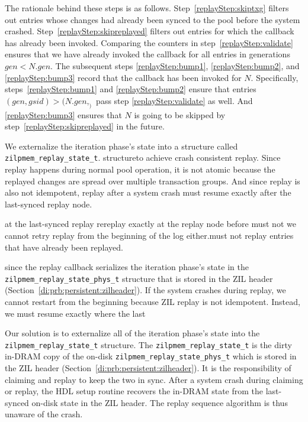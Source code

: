 \documentclass[12pt,a4paper,twoside]{book}
\begin{document}
The rationale behind these steps is as follows.
Step~\ref{replayStep:skiptxg} filters out entries whose changes had already been synced to the pool before the system crashed.
Step~\ref{replayStep:skipreplayed} filters out entries for which the callback has already been invoked.
Comparing the counters in step~\ref{replayStep:validate} ensures that we have already invoked the callback for all entries in generations $gen < N.gen$.
The subsequent steps \ref{replayStep:bump1}, \ref{replayStep:bump2}, and \ref{replayStep:bump3} record that the callback has been invoked for $N$.
Specifically, steps~\ref{replayStep:bump1} and \ref{replayStep:bump2} ensure that entries $(gen, gsid) > (N.gen, _)$ pass step \ref{replayStep:validate} as well.
And \ref{replayStep:bump3} ensures that $N$ is going to be skipped by step~\ref{replayStep:skipreplayed} in the future.

We externalize the iteration phase's state into a structure called \lstinline{zilpmem_replay_state_t}.
structureto achieve crash consistent replay.
Since replay happens during normal pool operation, it is not atomic because the replayed changes are spread over multiple transaction groups.
And since replay is also not idempotent, replay after a system crash must resume exactly after the last-synced replay node.


at the last-synced replay  rereplay exactly at the replay node before  must not we cannot retry replay from the beginning of the log either.must not replay entries that have already been replayed.



since 
the replay callback serializes the iteration phase's state in the \lstinline{zilpmem_replay_state_phys_t} structure that is stored in the ZIL header (Section~\ref{di:prb:persistent:zilheader}).
If the system crashes during replay, we cannot restart from the beginning because ZIL replay is not idempotent.
Instead, we must resume exactly where the last 


Our solution is to externalize all of the iteration phase's state into the \lstinline{zilpmem_replay_state_t} structure.
The \lstinline{zilpmem_replay_state_t} is the dirty in-DRAM copy of the on-disk \lstinline{zilpmem_replay_state_phys_t} which is stored in the ZIL header (Section~\ref{di:prb:persistent:zilheader}).
It is the responsibility of claiming and replay to keep the two in sync.
After a system crash during claiming or replay, the HDL setup routine recovers the in-DRAM state from the last-synced on-disk state in the ZIL header.
The replay sequence algorithm is thus unaware of the crash.
\end{document}
